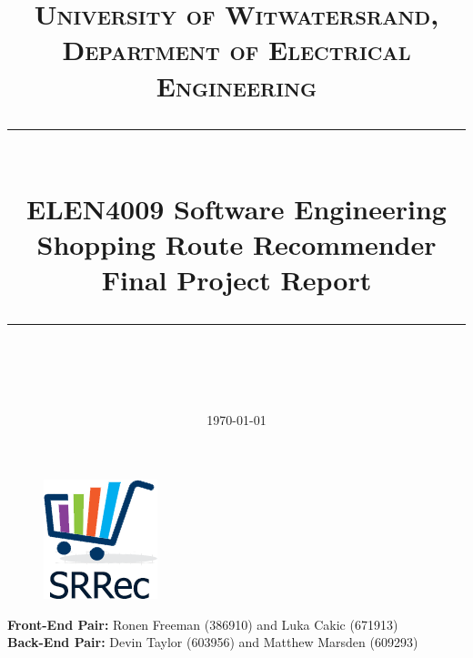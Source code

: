 \documentclass[10pt, a4paper, twocolumn]{scrartcl}
\begin{document}
 

\onecolumn
\thispagestyle{empty}

\newcommand{\horrule}[1]{\rule{\linewidth}{#1}}

	\title{\normalfont \normalsize
		\textsc{University of Witwatersrand, Department of Electrical Engineering} \\ [10pt]
		\horrule{0.5pt} \\ [10pt]
		\huge ELEN4009 Software Engineering \\ Shopping Route Recommender Final Project Report \\
		\horrule{2pt} \\ }
	\date {\normalsize \today}
	
	\maketitle

	\begin{figure}[h!]
		\centering
		\includegraphics[scale = 1.5]{Images/logo.png}
	\end{figure}

\vspace{60pt}
\textbf{Front-End Pair:} Ronen Freeman (386910) and Luka Cakic (671913) \\

\textbf{Back-End Pair:} Devin Taylor (603956) and Matthew Marsden (609293)
\end{document}

